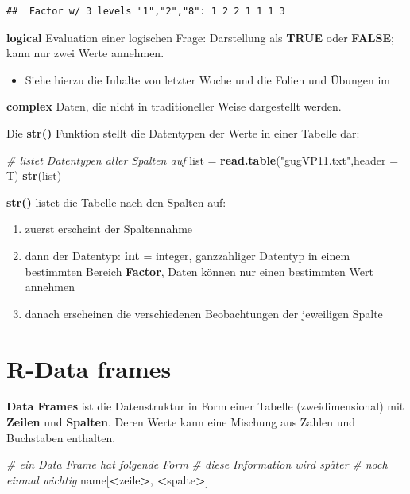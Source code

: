 \documentclass[]{book}
\newenvironment{Shaded}{\begin{snugshade}}{\end{snugshade}}
\newcommand{\KeywordTok}[1]{\textcolor[rgb]{0.13,0.29,0.53}{\textbf{#1}}}
\newcommand{\DataTypeTok}[1]{\textcolor[rgb]{0.13,0.29,0.53}{#1}}
\newcommand{\StringTok}[1]{\textcolor[rgb]{0.31,0.60,0.02}{#1}}
\newcommand{\CommentTok}[1]{\textcolor[rgb]{0.56,0.35,0.01}{\textit{#1}}}
\newcommand{\OperatorTok}[1]{\textcolor[rgb]{0.81,0.36,0.00}{\textbf{#1}}}
\newcommand{\NormalTok}[1]{#1}
\providecommand{\tightlist}{%
  \setlength{\itemsep}{0pt}\setlength{\parskip}{0pt}}
\begin{document}
\begin{verbatim}
##  Factor w/ 3 levels "1","2","8": 1 2 2 1 1 1 3
\end{verbatim}

\textbf{logical} Evaluation einer logischen Frage: Darstellung als
\textbf{TRUE} oder \textbf{FALSE}; kann nur zwei Werte annehmen.

\begin{itemize}
\tightlist
\item
  Siehe hierzu die Inhalte von letzter Woche und die Folien und Übungen
  im
\end{itemize}

\textbf{complex} Daten, die nicht in traditioneller Weise dargestellt
werden.

Die \textbf{str()} Funktion stellt die Datentypen der Werte in einer
Tabelle dar:

\begin{Shaded}
\begin{Highlighting}[]
\CommentTok{# listet Datentypen aller Spalten auf}
\NormalTok{list =}\StringTok{ }\KeywordTok{read.table}\NormalTok{(}\StringTok{"gugVP11.txt"}\NormalTok{,}\DataTypeTok{header =}\NormalTok{ T)}
\KeywordTok{str}\NormalTok{(list)}
\end{Highlighting}
\end{Shaded}

\textbf{str()} listet die Tabelle nach den Spalten auf:

\begin{enumerate}
\def\labelenumi{\arabic{enumi}.}
\tightlist
\item
  zuerst erscheint der Spaltennahme
\item
  dann der Datentyp: \textbf{int} = integer, ganzzahliger Datentyp in
  einem bestimmten Bereich \textbf{Factor}, Daten können nur einen
  bestimmten Wert annehmen
\item
  danach erscheinen die verschiedenen Beobachtungen der jeweiligen
  Spalte
\end{enumerate}

\section{R-Data frames}\label{r-data-frames}

\textbf{Data Frames} ist die Datenstruktur in Form einer Tabelle
(zweidimensional) mit \textbf{Zeilen} und \textbf{Spalten}. Deren Werte
kann eine Mischung aus Zahlen und Buchstaben enthalten.

\begin{Shaded}
\begin{Highlighting}[]
\CommentTok{# ein Data Frame hat folgende Form}
\CommentTok{# diese Information wird später}
\CommentTok{# noch einmal wichtig}
\NormalTok{name[}\OperatorTok{<}\NormalTok{zeile}\OperatorTok{>}\NormalTok{, }\OperatorTok{<}\NormalTok{spalte}\OperatorTok{>}\NormalTok{]}
\end{Highlighting}
\end{Shaded}
\end{document}
